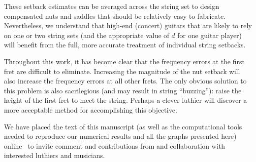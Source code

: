 These setback estimates can be averaged across the string set to design compensated nuts and saddles that should be relatively easy to fabricate. Nevertheless, we understand that high-end (concert) guitars that are likely to rely on one or two string sets (and the appropriate value of $d$ for one guitar player) will benefit from the full, more accurate treatment of individual string setbacks.

Throughout this work, it has become clear that the frequency errors at the first fret are difficult to eliminate. Increasing the magnitude of the nut setback will also increase the frequency errors at all other frets. The only obvious solution to this problem is also sacrilegious (and may result in string ``buzzing''): raise the height of the first fret to meet the string. Perhaps a clever luthier will discover a more acceptable method for accomplishing this objective.

We have placed the text of this manuscript (as well as the computational tools needed to reproduce our numerical results and all the graphs presented here) online~\cite{ref:github2024rgb} to invite comment and contributions from and collaboration with interested luthiers and musicians.